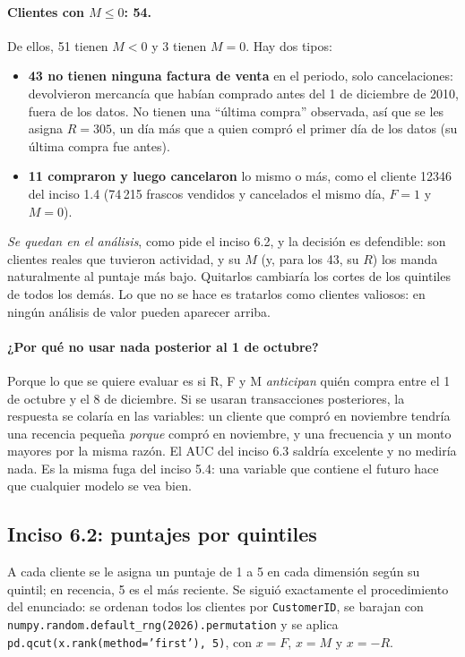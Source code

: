 \paragraph{Clientes con $M\leq0$: 54.} De ellos, 51 tienen $M<0$ y 3 tienen
$M=0$. Hay dos tipos:
\begin{itemize}
  \item \textbf{43 no tienen ninguna factura de venta} en el periodo, solo
    cancelaciones: devolvieron mercancía que habían comprado antes del 1 de
    diciembre de 2010, fuera de los datos. No tienen una ``última compra''
    observada, así que se les asigna $R=305$, un día más que a quien compró
    el primer día de los datos (su última compra fue antes).
  \item \textbf{11 compraron y luego cancelaron} lo mismo o más, como el
    cliente 12346 del inciso 1.4 (74\,215 frascos vendidos y cancelados el
    mismo día, $F=1$ y $M=0$).
\end{itemize}
\emph{Se quedan en el análisis}, como pide el inciso 6.2, y la decisión es
defendible: son clientes reales que tuvieron actividad, y su $M$ (y, para los
43, su $R$) los manda naturalmente al puntaje más bajo. Quitarlos cambiaría
los cortes de los quintiles de todos los demás. Lo que no se hace es tratarlos
como clientes valiosos: en ningún análisis de valor pueden aparecer arriba.

\paragraph{¿Por qué no usar nada posterior al 1 de octubre?} Porque lo que se
quiere evaluar es si R, F y M \emph{anticipan} quién compra entre el 1 de
octubre y el 8 de diciembre. Si se usaran transacciones posteriores, la
respuesta se colaría en las variables: un cliente que compró en noviembre
tendría una recencia pequeña \emph{porque} compró en noviembre, y una
frecuencia y un monto mayores por la misma razón. El AUC del inciso 6.3 saldría
excelente y no mediría nada. Es la misma fuga del inciso 5.4: una variable
que contiene el futuro hace que cualquier modelo se vea bien.

\subsection{Inciso 6.2: puntajes por quintiles}

A cada cliente se le asigna un puntaje de 1 a 5 en cada dimensión según su
quintil; en recencia, 5 es el más reciente. Se siguió exactamente el
procedimiento del enunciado: se ordenan todos los clientes por
\texttt{CustomerID}, se barajan con
\texttt{numpy.random.default\_rng(2026).permutation} y se aplica
\texttt{pd.qcut(x.rank(method='first'), 5)}, con $x=F$, $x=M$ y $x=-R$.

